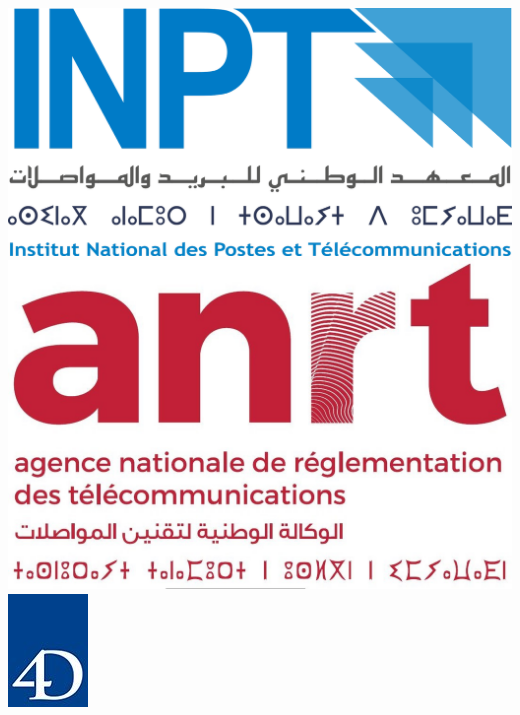 \begin{titlepage}

\includegraphics[scale=0.11]{Images/logo-inpt.png}
\hspace{9.0cm}
\includegraphics[scale=0.11]{Images/logo-anrt.jpg}
\\

\hspace{7.0cm}
\includegraphics[scale=0.8]{Images/logo-4d.jpg}
\vspace{0.4cm}



\end{titlepage}
